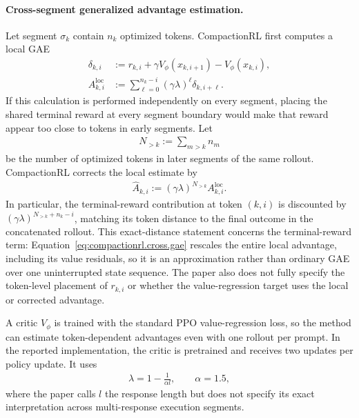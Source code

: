 \paragraph{Cross-segment generalized advantage estimation.}
Let segment $\sigma_k$ contain $n_k$ optimized tokens.  CompactionRL first
computes a local GAE
\begin{align}
    \delta_{k,i}
    &:=
    r_{k,i}
    +\gamma V_\phi(x_{k,i+1})
    -V_\phi(x_{k,i}), \\
    A_{k,i}^{\mathrm{loc}}
    &:=
    \sum_{\ell=0}^{n_k-i}
    (\gamma\lambda)^\ell\delta_{k,i+\ell}.
    \label{eq:compactionrl.local.gae}
\end{align}
If this calculation is performed independently on every segment, placing the
shared terminal reward at every segment boundary would make that reward appear
too close to tokens in early segments.  Let
\begin{align}
    N_{>k}:=\sum_{m>k}n_m
\end{align}
be the number of optimized tokens in later segments of the same rollout.
CompactionRL corrects the local estimate by
\begin{align}
    \widehat A_{k,i}
    :=
    (\gamma\lambda)^{N_{>k}}A_{k,i}^{\mathrm{loc}}.
    \label{eq:compactionrl.cross.gae}
\end{align}
In particular, the terminal-reward contribution at token $(k,i)$ is
discounted by
$(\gamma\lambda)^{N_{>k}+n_k-i}$, matching its token distance to the final
outcome in the concatenated rollout.  This exact-distance statement concerns
the terminal-reward term: Equation~\eqref{eq:compactionrl.cross.gae} rescales
the entire local advantage, including its value residuals, so it is an
approximation rather than ordinary GAE over one uninterrupted state sequence.
The paper also does not fully specify the token-level placement of
$r_{k,i}$ or whether the value-regression target uses the local or corrected
advantage.

A critic $V_\phi$ is trained with the standard PPO value-regression loss, so
the method can estimate token-dependent advantages even with one rollout per
prompt.  In the reported implementation, the critic is pretrained and receives
two updates per policy update.  It uses
\begin{align}
    \lambda=1-\frac{1}{\alpha l},
    \qquad \alpha=1.5,
\end{align}
where the paper calls $l$ the response length but does not specify its exact
interpretation across multi-response execution segments.

